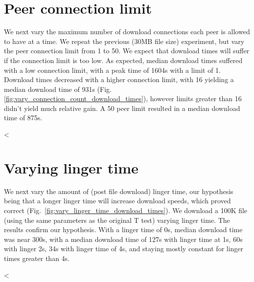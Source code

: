\section{Peer connection limit} 

We next vary the maximum number of download connections each peer is allowed to have at a time.  We repeat the previous (30MB file size) experiment, but vary the peer connection limit from 1 to 50.  We expect that download times will suffer if the connection limit is too low.  As expected, median download times suffered with a low connection limit, with a peak time of 1604s with a limit of 1.  Download times decreased with a higher connection limit, with 16 yielding a median download time of 931s (Fig. \ref{fig:vary_connection_count_download_times}), however limits greater than 16 didn't yield much relative gain.  A 50 peer limit resulted in a median download time of 875s.

<%

\section{Varying linger time}

We next vary the amount of (post file download) linger time, our hypothesis being that a longer linger time will increase download speeds, which proved correct (Fig.~\ref{fig:vary_linger_time_download_times}).  We download a 100K file (using the same parameters as the original T test) varying linger time.  The results confirm our hypothesis.  With a linger time of 0s, median download time was near 300s, with a median download time of 127s with linger time at 1s, 60s with linger 2s, 34s with linger time of 4s, and staying mostly constant for linger times greater than 4s.

<%
